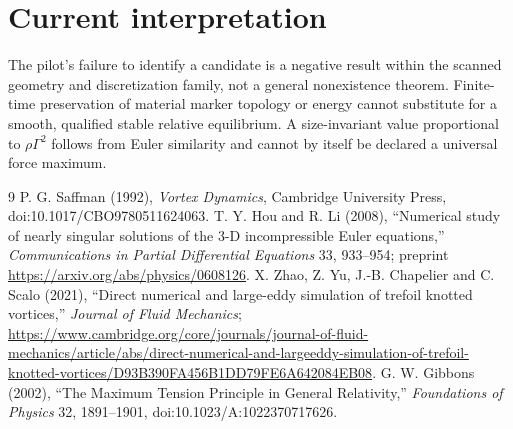 \documentclass[11pt,a4paper]{article}
\begin{document}
\section{Current interpretation}
The pilot's failure to identify a candidate is a negative result within the scanned geometry and discretization family, not a general nonexistence theorem. Finite-time preservation of material marker topology or energy cannot substitute for a smooth, qualified stable relative equilibrium. A size-invariant value proportional to $\rho\Gamma^2$ follows from Euler similarity and cannot by itself be declared a universal force maximum.
\begin{thebibliography}{9}
 P. G. Saffman (1992), \emph{Vortex Dynamics}, Cambridge University Press, doi:10.1017/CBO9780511624063.
 T. Y. Hou and R. Li (2008), ``Numerical study of nearly singular solutions of the 3-D incompressible Euler equations,'' \emph{Communications in Partial Differential Equations} 33, 933--954; preprint \url{https://arxiv.org/abs/physics/0608126}.
 X. Zhao, Z. Yu, J.-B. Chapelier and C. Scalo (2021), ``Direct numerical and large-eddy simulation of trefoil knotted vortices,'' \emph{Journal of Fluid Mechanics}; \url{https://www.cambridge.org/core/journals/journal-of-fluid-mechanics/article/abs/direct-numerical-and-largeeddy-simulation-of-trefoil-knotted-vortices/D93B390FA456B1DD79FE6A642084EB08}.
 G. W. Gibbons (2002), ``The Maximum Tension Principle in General Relativity,'' \emph{Foundations of Physics} 32, 1891--1901, doi:10.1023/A:1022370717626.
\end{thebibliography}
\end{document}
